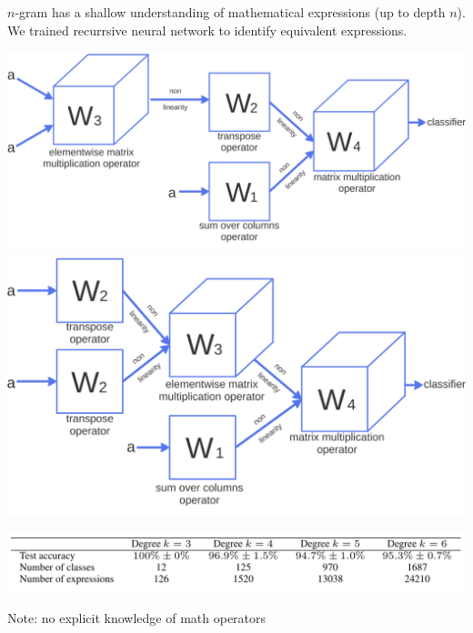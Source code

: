 \documentclass[landscape,a0b]{a0poster_csml_v2}
\begin{document}
\begin{poster}
\begin{PosterColumn}
$n$-gram has a shallow understanding of mathematical expressions (up to depth $n$).
We trained recurrsive neural network to identify equivalent expressions.
\begin{minipage}[hc]{\textwidth}
  \includegraphics[width=0.45\linewidth]{imgs/tnn.png}
  \hfill
  \includegraphics[width=0.45\linewidth]{imgs/tnn2.png}
\end{minipage}
\includegraphics[width=0.98\linewidth]{imgs/print_trees.png}
\begin{center}
Note: no explicit knowledge of math operators
\end{center}

\end{PosterColumn}

\end{poster}
\end{document}
